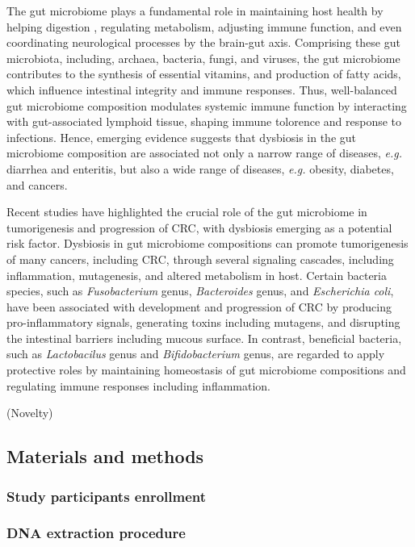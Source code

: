 \documentclass[11pt, a4paper, onecolumn, oneside]{report}
\begin{document}
            The gut microbiome plays a fundamental role in maintaining host health by helping digestion \cite{gut-digestion-1, gut-digestion-2}, regulating metabolism, adjusting immune function, and even coordinating neurological processes by the brain-gut axis. Comprising these gut microbiota, including, archaea, bacteria, fungi, and viruses, the gut microbiome contributes to the synthesis of essential vitamins, and production of fatty acids, which influence intestinal integrity and immune responses. Thus, well-balanced gut microbiome composition modulates systemic immune function by interacting with gut-associated lymphoid tissue, shaping immune tolorence and response to infections. Hence, emerging evidence suggests that dysbiosis in the gut microbiome composition are associated not only a narrow range of diseases, \textit{e.g.} diarrhea and enteritis, but also a wide range of diseases, \textit{e.g.} obesity, diabetes, and cancers.

            Recent studies have highlighted the crucial role of the gut microbiome in tumorigenesis and progression of CRC, with dysbiosis emerging as a potential risk factor. Dysbiosis in gut microbiome compositions can promote tumorigenesis of many cancers, including CRC, through several signaling cascades, including inflammation, mutagenesis, and altered metabolism in host. Certain bacteria species, such as \textit{Fusobacterium} genus, \textit{Bacteroides} genus, and \textit{Escherichia coli}, have been associated with development and progression of CRC by producing pro-inflammatory signals, generating toxins including mutagens, and disrupting the intestinal barriers including mucous surface. In contrast, beneficial bacteria, such as \textit{Lactobacilus} genus and \textit{Bifidobacterium} genus, are regarded to apply protective roles by maintaining homeostasis of gut microbiome compositions and regulating immune responses including inflammation.

            (Novelty)
        \clearpage

        \subsection{Materials and methods}
            \subsubsection{Study participants enrollment}
            \subsubsection{DNA extraction procedure}
\end{document}
